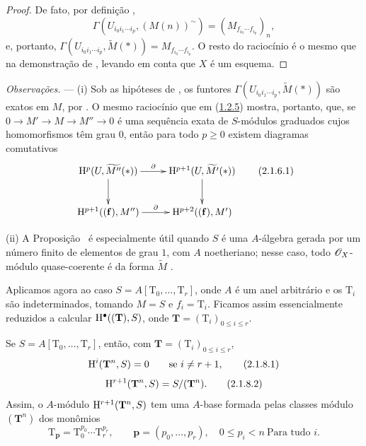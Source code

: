 \begin{proof}
De fato, por definição ,
\[
  \Gamma(U_{i_0i_1\cdots i_p},(M(n))^\sim)
  =(M_{f_{i_0}\cdots f_{i_p}})_n,
\]
e, portanto, $\Gamma(U_{i_0i_1\cdots i_p},\widetilde{M}(*))=M_{f_{i_0}\cdots f_{i_p}}$.
O resto do raciocínio é o mesmo que na demonstração de , levando em conta que $X$ é um esquema.
\end{proof}

\begin{env}[2.1.6]
\label{III.2.1.6}
\emph{Observações.} ---
(i) Sob as hipóteses de , os funtores $\Gamma(U_{i_0i_1\cdots i_p},\widetilde{M}(*))$ são exatos em $M$, por .
O mesmo raciocínio que em (\hyperref[III.1.2.5]{1.2.5}) mostra, portanto, que, se $0\to M'\to M\to M''\to0$ é uma sequência exata de $S$-módulos graduados cujos homomorfismos têm grau $0$, então para todo $p\geq0$ existem diagramas comutativos
\[
\label{III.2.1.6.1}
  \xymatrix{
    \HH^p(U,\widetilde{M''}(*)) \ar[r]^-\partial \ar[d] &
    \HH^{p+1}(U,\widetilde{M'}(*)) \ar[d] \\
    \HH^{p+1}((\mathbf{f}),M'') \ar[r]^-\partial &
    \HH^{p+2}((\mathbf{f}),M')
  }
  \tag{2.1.6.1}
\]

(ii) A Proposição~ é especialmente útil quando $S$ é uma $A$-álgebra gerada por um número finito de elementos de grau $1$, com $A$ noetheriano; nesse caso, todo $\mathscr{O}_X$-módulo quase-coerente é da forma $\widetilde{M}$ .
\end{env}

\begin{env}[2.1.7]
\label{III.2.1.7}
Aplicamos agora  ao caso $S=A[\mathrm{T}_0,\dots,\mathrm{T}_r]$, onde $A$ é um anel arbitrário e os $\mathrm{T}_i$ são indeterminados, tomando $M=S$ e $f_i=\mathrm{T}_i$.
Ficamos assim essencialmente reduzidos a calcular $\mathrm{H}^\bullet((\mathbf{T}),S)$, onde $\mathbf{T}=(\mathrm{T}_i)_{0\leq i\leq r}$.
\end{env}

\begin{lemma}[2.1.8]
\label{III.2.1.8}
Se $S=A[\mathrm{T}_0,\dots,\mathrm{T}_r]$, então, com $\mathbf{T}=(\mathrm{T}_i)_{0\leq i\leq r}$,
\[
\label{III.2.1.8.1}
  \HH^i(\mathbf{T}^n,S)=0
  \qquad\text{se }i\neq r+1,
  \tag{2.1.8.1}
\]
\[
\label{III.2.1.8.2}
  \HH^{r+1}(\mathbf{T}^n,S)=S/(\mathbf{T}^n).
  \tag{2.1.8.2}
\]
Assim, o $A$-módulo $\mathrm{H}^{r+1}(\mathbf{T}^n,S)$ tem uma $A$-base formada pelas classes módulo $(\mathbf{T}^n)$ dos monômios
\[
  \mathrm{T}_{\mathbf{p}}=\mathrm{T}_0^{p_0}\cdots\mathrm{T}_r^{p_r},
  \qquad \mathbf{p}=(p_0,\dots,p_r),\quad 0\leq p_i<n\ \text{Para tudo }i.
\]
\end{lemma}

